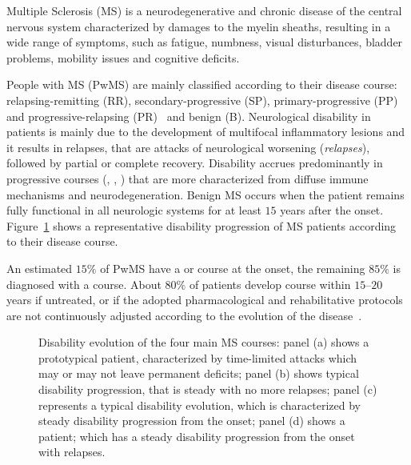 Multiple Sclerosis (MS) is a neurodegenerative and chronic disease of the central nervous system characterized by damages to the myelin sheaths, resulting in a wide range of symptoms, such as fatigue, numbness, visual disturbances, bladder problems, mobility issues and cognitive deficits.


People with MS (PwMS) are mainly classified according to their disease course:
relapsing-remitting (\ac{RR}), secondary-progressive (\ac{SP}), primary-progressive (\ac{PP}) and progressive-relapsing (\ac{PR})~\cite{giovannoni2016brain} and benign (\ac{B}).
Neurological disability in \RR patients is mainly due to the development of multifocal inflammatory lesions and it results in relapses, that are attacks of neurological worsening (\ie \textit{relapses}), followed by partial or complete recovery. Disability accrues predominantly in progressive courses (\SP, \PP, \PR) that are more characterized from diffuse immune mechanisms and neurodegeneration.
Benign MS occurs when the patient remains fully functional in all neurologic systems for at least $15$ years after the onset.
Figure~\ref{fig:ms_mock} shows a representative disability progression of MS patients according to their disease course.

An estimated $15\%$ of PwMS have a \PP or \PR course at the onset, the remaining $85\%$ is diagnosed with a \RR course.
About $80\%$ of \RR patients develop \SP course within $15\text{--}20$ years if untreated, or if the adopted pharmacological and rehabilitative protocols are not continuously adjusted according to the evolution of the disease~\cite{scalfari2014onset}.

\begin{figure}[]
	\centering
	\hfill
	\caption{Disability evolution of the four main MS courses: panel (a) shows a prototypical \RR patient, characterized by time-limited attacks which may or may not leave permanent deficits; panel (b) shows \SP typical disability progression, that is steady with no more relapses; panel (c) represents a typical \PR disability evolution, which is characterized by steady disability progression from the onset; panel (d) shows a \PR patient; which has a steady disability progression from the onset with relapses.} \label{fig:ms_mock}
\end{figure}


